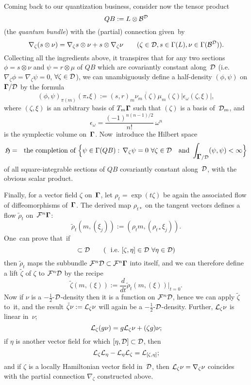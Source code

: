 \documentclass[12pt]{amsart}
\numberwithin{equation}{section}
\theoremstyle{remark}
\newcommand\Omg{{\bigam}}   %
\newcommand\FF{\Cal F}
\newcommand\DD{{\Cal D}}
\newcommand\MD{{\Omg/\DD}}
\newcommand\mhD{$-\tfrac12$-$\DD$}
\newcommand\BB{\Cal B}
\newcommand\LL{\Cal L}
\newcommand\HH{\mathfrak H}
\newcommand{\bigam}{\mbox{\boldmath $\Gamma$}}
\begin{document}
Coming back to our quantization business, consider now the tensor product
\begin{equation}  QB := L\otimes \BB^\DD  \label{tag:QBU}  \end{equation}
(the {\it quantum bundle\/}) with the (partial) connection given~by
\begin{equation}  \nabla_\zeta(s\otimes\nu)=\nabla_\zeta s\otimes\nu +
s\otimes\nabla_\zeta\nu \qquad (\zeta\in\DD, s\in\Gamma(L),
\nu\in\Gamma(\BB^\DD)).  \label{tag:HDCC}  \end{equation}
Collecting all the ingredients above, it transpires that for any two sections
$\phi=s\otimes\nu$ and $\psi=r\otimes\mu$ of $QB$ which are covariantly
constant along~$\DD$ (i.e.~$\nabla_\zeta\phi=\nabla_\zeta\psi=0$, \;
$\forall\zeta\in\DD$), we can unambiguously define a half-density $(\phi,\psi)$
on $\MD$ by the formula
$$ (\phi,\psi)_{\pi(m)}(\pi_*\xi) := (s,r)_m \overline{\nu_m(\zeta)}
\mu_m(\zeta) |\epsilon_\omega (\zeta,\xi)|,  $$
where $(\zeta,\xi)$ is an arbitrary basis of $T_m \Omg$ such that $(\zeta)$ is
a basis of~$\DD_m$, and
\begin{equation}  \epsilon_\omega = \frac{(-1)^{n(n-1)/2}}{n!} \, \omega^n
\label{tag:HDEE}  \end{equation}
is the symplectic volume on~$\Omg$. Now~introduce the Hilbert space
$$ \HH=\text{the completion of } \Big\{ \psi\in\Gamma(QB):\,\nabla_\zeta \psi=0
\ \forall\zeta\in\DD \text{ and } \int_{\MD} (\psi,\psi) <\infty \Big\}   $$
of all square-integrable sections of $QB$ covariantly constant along~$\DD$,
with the obvious scalar product.

Finally, for a vector field $\zeta$ on~$\Omg$, let $\rho_t=\exp(t\zeta)$ be
again the associated flow of diffeomorphisms of~$\Omg$. The derived map
$\rho_{t*}$ on the tangent vectors defines a flow $\tilde\rho_t$
on~$\FF^n \Omg$:
$$ \tilde\rho_t (m,(\xi_j)) := (\rho_t m,(\rho_{t*}\xi_j)).  $$
One~can prove that~if
\begin{equation}  [\zeta,\DD]\subset\DD \qquad
(\text{i.e.~} [\zeta,\eta]\in\DD\ \forall\eta\in\DD)  \label{tag:HDD}
\end{equation}
then $\tilde\rho_t$ maps the subbundle $\FF^n\DD\subset\FF^n \Omg$ into itself,
and we can therefore define a lift $\tilde\zeta$ of $\zeta$ to $\FF^n\DD$ by
the recipe
$$ \tilde\zeta (m,(\xi)) := \frac d{dt} \tilde\rho_t(m,(\xi)) \Big|_{t=0}.  $$
Now if $\nu$ is a \mhD-density then it is a function on $\FF^n\DD$, hence we
can apply $\tilde\zeta$ to~it, and the result $\tilde\zeta\nu:=\LL_\zeta\nu$
will again be a \mhD-density. Further, $\LL_\zeta\nu$ is linear in~$\nu$;
\begin{equation}  \LL_\zeta(g\nu) = g\LL_\zeta\nu+(\zeta g)\nu;
\label{tag:LIEA}  \end{equation}
if $\eta$ is another vector field for which $[\eta,\DD]\subset\DD$, then
\begin{equation}  \LL_\zeta\LL_\eta-\LL_\eta\LL_\zeta = \LL_{[\zeta,\eta]};
\label{tag:LIEB}  \end{equation}
and if $\zeta$ is a locally Hamiltonian vector field in~$\DD$, then
$\LL_\zeta\nu=\nabla_\zeta\nu$ coincides with the partial connection
$\nabla_\zeta$ constructed above.
\end{document}
